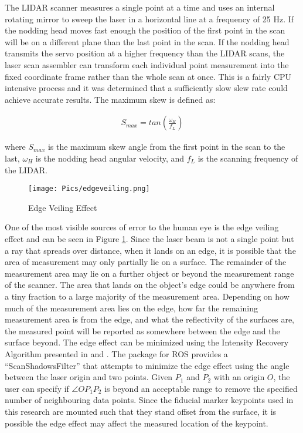 The LIDAR scanner measures a single point at a time and uses an internal rotating mirror to sweep the laser in a horizontal line at a frequency of 25 Hz. If the nodding head moves fast enough the position of the first point in the scan will be on a different plane than the last point in the scan. If the nodding head transmits the servo position at a higher frequency than the LIDAR scans, the laser scan assembler can transform each individual point measurement into the fixed coordinate frame rather than the whole scan at once. This is a fairly CPU intensive process and it was determined that a sufficiently slow slew rate could achieve accurate results. The maximum skew is defined as:

\begin{align}
    S_{max} = tan\left(\frac{\omega_H}{f_L}\right)
\end{align}

where $S_{max}$ is the maximum skew angle from the first point in the scan to the last, $\omega_H$ is the nodding head angular velocity, and $f_L$ is the scanning frequency of the LIDAR.\\

\begin{figure}
    \centering
    \texttt{[image: Pics/edgeveiling.png]}
    \caption{Edge Veiling Effect}
    \label{fig:veiling}
\end{figure}

One of the most visible sources of error to the human eye is the edge veiling effect and can be seen in Figure \ref{fig:veiling}. Since the laser beam is not a single point but a ray that spreads over distance, when it lands on an edge, it is possible that the area of measurement may only partially lie on a surface. The remainder of the measurement area may lie on a further object or beyond the measurement range of the scanner. The area that lands on the object's edge could be anywhere from a tiny fraction to a large majority of the measurement area. Depending on how much of the measurement area lies on the edge, how far the remaining measurement area is from the edge, and what the reflectivity of the surfaces are, the measured point will be reported as somewhere between the edge and the surface beyond. The edge effect can be minimized using the Intensity Recovery Algorithm presented in \cite{bookbaredge} and \cite{theotherone}. The  package for ROS provides a ``ScanShadowsFilter'' that attempts to minimize the edge effect using the angle between the laser origin and two points. Given $P_1$ and $P_2$ with an origin $O$, the user can specify if $\angle OP_1P_2$ is beyond an acceptable range to remove the specified number of neighbouring data points. Since the fiducial marker keypoints used in this research are mounted such that they stand offset from the surface, it is possible the edge effect may affect the measured location of the keypoint.\\

